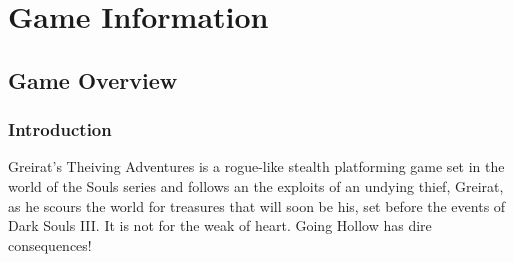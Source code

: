 \documentclass[11pt,fleqn]{book} %
\begin{document}




\pagestyle{empty} %

\tableofcontents %

\cleardoublepage %

\pagestyle{fancy} %


\part{Game Information}



\chapter{Game Overview}

\section{Introduction}

Greirat's Theiving Adventures is a rogue-like stealth platforming game set in the world of the Souls series and follows an the exploits of an undying thief, Greirat, as he scours the world for treasures that will soon be his, set before the events of Dark Souls III. It is not for the weak of heart. Going Hollow has dire consequences!
\end{document}
